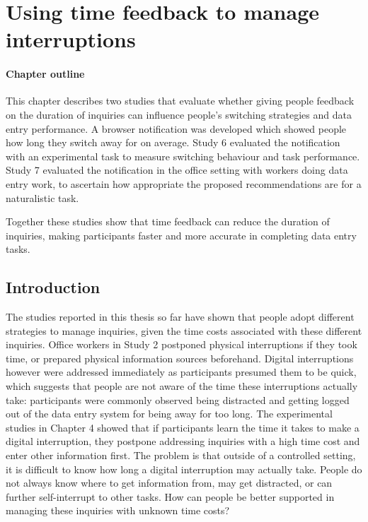 \chapter{Using time feedback to manage interruptions}\label{ch:56}
\begin{mynote}
\subsubsection{Chapter outline}
This chapter describes two studies that evaluate whether giving people feedback on the duration of inquiries can influence people's switching strategies and data entry performance. A browser notification was developed which showed people how long they switch away for on average. Study 6 evaluated the notification with an experimental task to measure switching behaviour and task performance. Study 7 evaluated the notification in the office setting with workers doing data entry work, to ascertain how appropriate the proposed recommendations are for a naturalistic task.

Together these studies show that time feedback can reduce the duration of inquiries, making participants faster and more accurate in completing data entry tasks.  
\end{mynote}

\section{Introduction}
The studies reported in this thesis so far have shown that people adopt different strategies to manage inquiries, given the time costs associated with these different inquiries. Office workers in Study 2 postponed physical interruptions if they took time, or prepared physical information sources beforehand. Digital interruptions however were addressed immediately as participants presumed them to be quick, which suggests that people are not aware of the time these interruptions actually take: participants were commonly observed being distracted and getting logged out of the data entry system for being away for too long. The experimental studies in Chapter 4 showed that if participants learn the time it takes to make a digital interruption, they postpone addressing inquiries with a high time cost and enter other information first. The problem is that outside of a controlled setting, it is difficult to know how long a digital interruption may actually take. People do not always know where to get information from, may get distracted, or can further self-interrupt to other tasks. How can people be better supported in managing these inquiries with unknown time costs?

